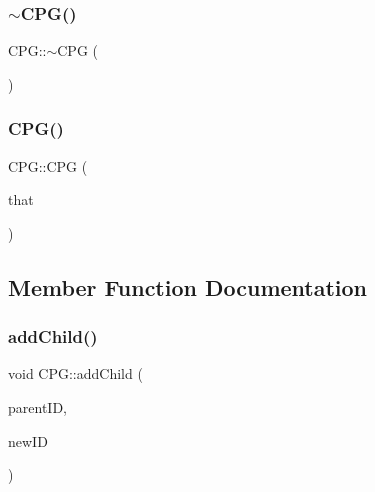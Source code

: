 \mbox{\label{classCPG_aa2cac8504168c1b0190ecc4760ef0cbe}} 
\subsubsection{\texorpdfstring{$\sim$\+C\+P\+G()}{~CPG()}}
{\footnotesize\ttfamily C\+P\+G\+::$\sim$\+C\+PG (\begin{DoxyParamCaption}{ }\end{DoxyParamCaption})\hspace{0.3cm}{\ttfamily [inline]}}

\mbox{\label{classCPG_a4f5aad687b3696340237e7669efe65b6}} 
\subsubsection{\texorpdfstring{C\+P\+G()}{CPG()}\hspace{0.1cm}{\footnotesize\ttfamily [4/4]}}
{\footnotesize\ttfamily C\+P\+G\+::\+C\+PG (\begin{DoxyParamCaption}\item[{const \mbox{\hyperlink{classCPG}{C\+PG}} \&}]{that }\end{DoxyParamCaption})\hspace{0.3cm}{\ttfamily [delete]}}



\subsection{Member Function Documentation}
\mbox{\label{classCPG_a1a182a410afd8e3b76cb16d99ddef541}} 
\subsubsection{\texorpdfstring{add\+Child()}{addChild()}}
{\footnotesize\ttfamily void C\+P\+G\+::add\+Child (\begin{DoxyParamCaption}\item[{unsigned}]{parent\+ID,  }\item[{unsigned}]{new\+ID }\end{DoxyParamCaption})}

